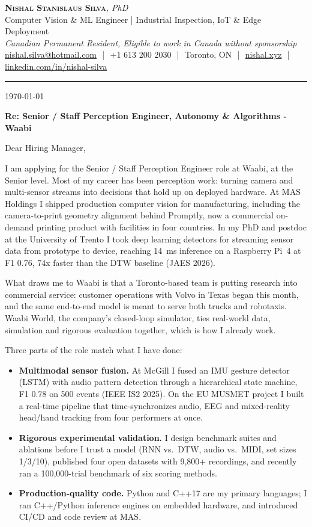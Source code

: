 \documentclass[11pt]{article}
\makeatletter
\newcommand{\clName}{Nishal Stanislaus Silva}
\newcommand{\clEmail}{nishal.silva@hotmail.com}
\newcommand{\clPhone}{+1 613 200 2030}
\newcommand{\clCity}{Toronto, ON}
\newcommand{\clSite}{https://nishal.xyz}
\newcommand{\clLinkedIn}{https://www.linkedin.com/in/nishal-silva}
\newcommand{\clStatus}{Canadian Permanent Resident, Eligible to work in Canada without sponsorship}
\newcommand{\clTagline}{Computer Vision \& ML Engineer | Industrial Inspection, IoT \& Edge Deployment}
\newcommand{\clRole}{Senior / Staff Perception Engineer}
\newcommand{\clCompany}{Waabi}
\makeatother
\begin{document}
\pagestyle{empty}

\begin{center}
    {\LARGE \scshape \textbf{\clName}}{\large \textit{, PhD}}
    \\[1pt]
    {\small \clTagline}
    \\[1pt]
    {\footnotesize\textit{\clStatus}}
    \\[1pt]
    {\small
    \href{mailto:\clEmail}{\clEmail}
    \,\,|\,\, \clPhone
    \,\,|\,\, \clCity
    \,\,|\,\, \href{\clSite}{nishal.xyz}
    \,\,|\,\, \href{\clLinkedIn}{linkedin.com/in/nishal-silva}}
\end{center}

\rule{\linewidth}{0.4pt}\vspace{0.6em}

\today

\textbf{Re: \clRole{}, Autonomy \& Algorithms - \clCompany{}}

Dear Hiring Manager,

I am applying for the \clRole{} role at \clCompany{}, at the Senior level. Most of my career has been perception work: turning camera and multi-sensor streams into decisions that hold up on deployed hardware. At MAS Holdings I shipped production computer vision for manufacturing, including the camera-to-print geometry alignment behind Promptly, now a commercial on-demand printing product with facilities in four countries. In my PhD and postdoc at the University of Trento I took deep learning detectors for streaming sensor data from prototype to device, reaching 14~ms inference on a Raspberry Pi~4 at F1 0.76, 74x faster than the DTW baseline (JAES 2026).

What draws me to \clCompany{} is that a Toronto-based team is putting research into commercial service: customer operations with Volvo in Texas began this month, and the same end-to-end model is meant to serve both trucks and robotaxis. Waabi World, the company's closed-loop simulator, ties real-world data, simulation and rigorous evaluation together, which is how I already work.

Three parts of the role match what I have done:
\begin{itemize}[leftmargin=1.4em, itemsep=0.1em, topsep=0.1em]
    \item \textbf{Multimodal sensor fusion.} At McGill I fused an IMU gesture detector (LSTM) with audio pattern detection through a hierarchical state machine, F1 0.78 on 500 events (IEEE IS2 2025). On the EU MUSMET project I built a real-time pipeline that time-synchronizes audio, EEG and mixed-reality head/hand tracking from four performers at once.
    \item \textbf{Rigorous experimental validation.} I design benchmark suites and ablations before I trust a model (RNN vs.\ DTW, audio vs.\ MIDI, set sizes 1/3/10), published four open datasets with 9,800+ recordings, and recently ran a 100,000-trial benchmark of six scoring methods.
    \item \textbf{Production-quality code.} Python and C++17 are my primary languages; I ran C++/Python inference engines on embedded hardware, and introduced CI/CD and code review at MAS.
\end{itemize}
\end{document}
